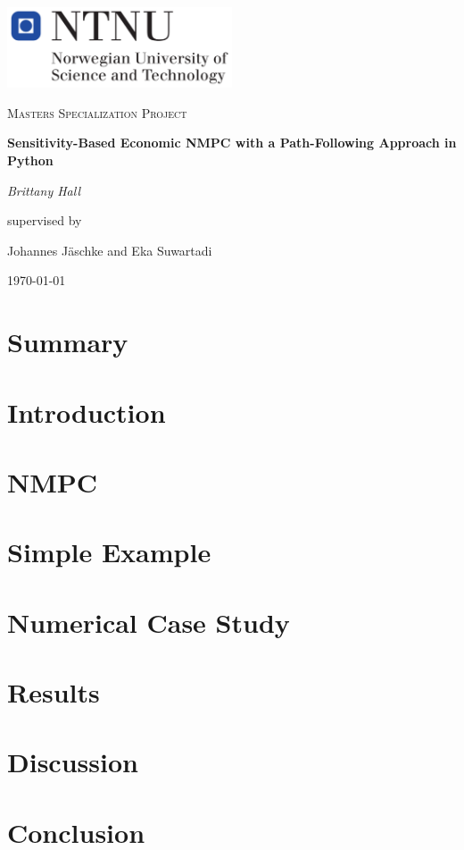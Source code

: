 \documentclass[12pt,a4paper]{report}
\begin{document}
\begin{titlepage}
	\centering
	\includegraphics[width=0.5\textwidth]{NTNU}\par\vspace{1cm}
	\vspace{1cm}
	{\scshape\Large Masters Specialization Project\par}
	\vspace{1.5cm}
	{\huge\bfseries Sensitivity-Based Economic NMPC with a Path-Following Approach in Python\par}
	\vspace{2cm}
	{\Large\itshape Brittany Hall\par}
	\vfill
	supervised by\par
	Johannes J{\"a}schke and Eka Suwartadi

	\vfill

	{\large \today\par}
\end{titlepage}
%
\tableofcontents
%
\chapter{Summary}
%
\chapter{Introduction}

\label{ch:intro}
%
\chapter{NMPC}

%
\chapter{Simple Example}

%
\chapter{Numerical Case Study}

%
\chapter{Results}

%
\chapter{Discussion}
%
\chapter{Conclusion}
%
\printbibliography
\end{document}
